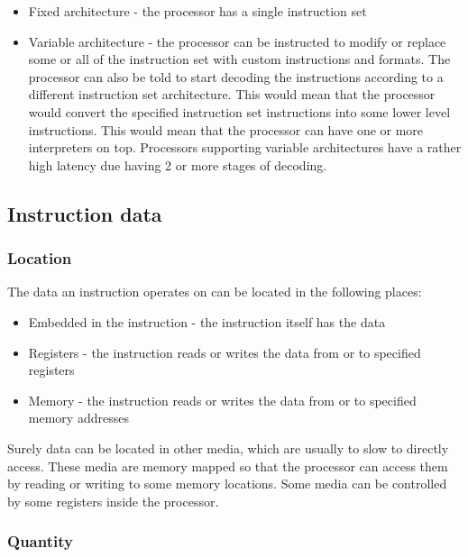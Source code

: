 \documentclass{report}
\begin{document}
\begin{itemize}
    \item{Fixed architecture - the processor has a single instruction set}
    \item{Variable architecture - the processor can be instructed to modify or
        replace some or all of the instruction set with custom instructions and
        formats. The processor can also be told to start decoding the
        instructions according to a different instruction set architecture.
        This would mean that the processor would convert the specified
        instruction set instructions into some lower level instructions. This
        would mean that the processor can have one or more interpreters on top.
        Processors supporting variable architectures have a rather high latency
        due having 2 or more stages of decoding.}
\end{itemize}

\subsection{Instruction data}

\subsubsection{Location}

The data an instruction operates on can be located in the following places:

\begin{itemize}
    \item{Embedded in the instruction - the instruction itself has the data}
    \item{Registers - the instruction reads or writes the data from or to
        specified registers}
    \item{Memory - the instruction reads or writes the data from or to
        specified memory addresses}
\end{itemize}

Surely data can be located in other media, which are usually to slow to directly
access. These media are memory mapped so that the processor can access them by
reading or writing to some memory locations. Some media can be controlled by
some registers inside the processor.

\subsubsection{Quantity}
\end{document}

